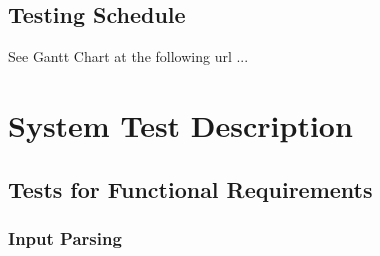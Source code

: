 \documentclass[12pt, titlepage]{article}
\begin{document}
\subsection{Testing Schedule}
		
See Gantt Chart at the following url ...

\section{System Test Description}
	
\subsection{Tests for Functional Requirements}

\subsubsection{Input Parsing}
		
\end{document}
